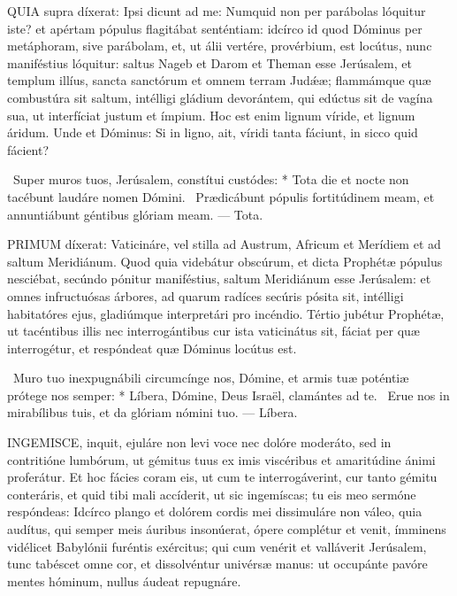 \lettrine[lines=2]{Q}{UIA} supra díxerat: Ipsi dicunt ad me: Numquid non per parábolas lóquitur iste? et apértam pópulus flagitábat senténtiam: idcírco id quod Dóminus per metáphoram, sive parábolam, et, ut álii vertére, provérbium, est locútus, nunc maniféstius lóquitur: saltus Nageb et Darom et Theman esse Jerúsalem, et templum illíus, sancta sanctórum et omnem terram Judǽæ; flammámque quæ combustúra sit saltum, intélligi gládium devorántem, qui edúctus sit de vagína sua, ut interfíciat justum et ímpium. Hoc est enim lignum víride, et lignum áridum. Unde et Dóminus: Si in ligno, ait, víridi tanta fáciunt, in sicco quid fácient?

\R\ Super muros tuos, Jerúsalem, constítui custódes: * Tota die et nocte non tacébunt laudáre nomen Dómini. \V\ Prædicábunt pópulis fortitúdinem meam, et annuntiábunt géntibus glóriam meam. — Tota.


\lettrine[lines=2]{P}{RIMUM} díxerat: Vaticináre, vel stilla ad Austrum, Africum et Merídiem et ad saltum Meridiánum. Quod quia videbátur obscúrum, et dicta Prophétæ pópulus nesciébat, secúndo pónitur maniféstius, saltum Meridiánum esse Jerúsalem: et omnes infructuósas árbores, ad quarum radíces secúris pósita sit, intélligi habitatóres ejus, gladiúmque interpretári pro incéndio. Tértio jubétur Prophétæ, ut tacéntibus illis nec interrogántibus cur ista vaticinátus sit, fáciat per quæ interrogétur, et respóndeat quæ Dóminus locútus est.

\R\ Muro tuo inexpugnábili circumcínge nos, Dómine, et armis tuæ poténtiæ prótege nos semper: * Líbera, Dómine, Deus Israël, clamántes ad te. \V\ Erue nos in mirabílibus tuis, et da glóriam nómini tuo. — Líbera.


\lettrine[lines=2]{I}{NGEMISCE}, inquit, ejuláre non levi voce nec dolóre moderáto, sed in contritióne lumbórum, ut gémitus tuus ex imis viscéribus et amaritúdine ánimi proferátur. Et hoc fácies coram eis, ut cum te interrogáverint, cur tanto gémitu conteráris, et quid tibi mali accíderit, ut sic ingemíscas; tu eis meo sermóne respóndeas: Idcírco plango et dolórem cordis mei dissimuláre non váleo, quia audítus, qui semper meis áuribus insonúerat, ópere complétur et venit, ímminens vidélicet Babylónii furéntis exércitus; qui cum venérit et valláverit Jerúsalem, tunc tabéscet omne cor, et dissolvéntur univérsæ manus: ut occupánte pavóre mentes hóminum, nullus áudeat repugnáre.

